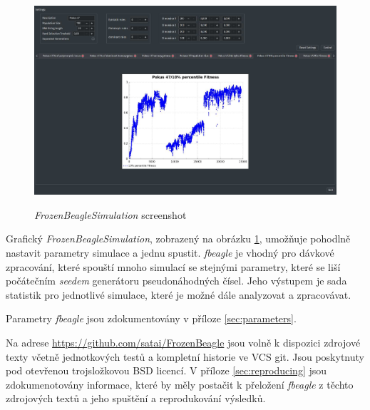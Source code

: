 \begin{figure}[h]
\caption{\textit{FrozenBeagleSimulation} screenshot}
\centering
\includegraphics[width=\textwidth]{img/Screenshot.pdf}
\label{fig:FrozenBeagleScreenshot}
\end{figure}

Grafický \textit{FrozenBeagleSimulation}, zobrazený na obrázku \ref{fig:FrozenBeagleScreenshot},
umožňuje pohodlně nastavit parametry simulace a jednu spustit. \textit{fbeagle} je vhodný pro dávkové zpracování,
které spouští mnoho simulací se stejnými parametry, které se liší počátečním \textit{seedem} generátoru
pseudonáhodných čísel. Jeho výstupem je sada statistik pro jednotlivé simulace, které je možné dále analyzovat
a zpracovávat.

Parametry \textit{fbeagle} jsou zdokumentovány v příloze \ref{sec:parameters}.

Na adrese \url {https://github.com/satai/FrozenBeagle} jsou volně k dispozici zdrojové texty včetně jednotkových testů
a kompletní historie ve VCS git. Jsou poskytnuty pod otevřenou trojsložkovou BSD licencí. V příloze \ref{sec:reproducing} jsou
zdokumenotovány informace, které by měly postačit k přeložení \textit{fbeagle} z těchto zdrojových textů
a jeho spuštění a reprodukování výsledků.

